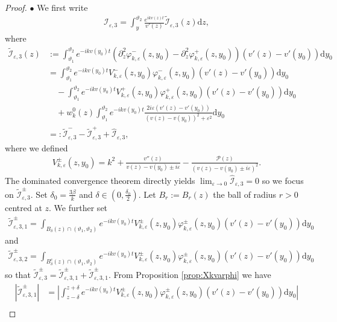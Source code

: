 \documentclass[10pt,a4paper]{amsart}
\newcommand\cI{{\mathcal I}}
\newcommand{\bullpar}[1]{\vspace{.5em}\noindent $\bullet$ \normalfont {\bfseries #1.}}
\newcommand{\ep}{\varepsilon}
\renewcommand{\P}{{\mathcal{P}}}
\renewcommand{\d}{\mathrm{d}}
\begin{document}
\begin{proof}
\bullpar{Estimates for $\cI_{\ep,3}$} 
We first write
\begin{align*}
\cI_{\ep,3} = \int_y^{\vartheta_2} \frac{e^{ikv(z) t}}{v'(z)}  \widetilde\cI_{\ep,3}(z) \d z,
\end{align*}
where
\begin{align*}
\widetilde\cI_{\ep,3}(z) &:= \int_{\vartheta_1}^{\vartheta_2} e^{-ikv(y_0)t}\left( \partial_z^2\varphi_{k,\ep}^-(z,y_0) - \partial_z^2\varphi_{k,\ep}^+(z,y_0) \right) (v'(z) - v'(y_0))\d y_0 \\
&= \int_{\vartheta_1}^{\vartheta_2} e^{-ikv(y_0)t} V_{k,\ep}^-(z,y_0)\varphi_{k,\ep}^-(z,y_0)(v'(z) - v'(y_0)) \d y_0 \\
& \quad - \int_{\vartheta_1}^{\vartheta_2} e^{-ikv(y_0)t} V_{k,\ep}^+(z,y_0) \varphi_{k,\ep}^+(z,y_0)(v'(z) - v'(y_0)) \d y_0 \\
& \quad+ w_k^0(z)\int_{\vartheta_1}^{\vartheta_2}e^{-ikv(y_0)t}\frac{2i\ep(v'(z) - v'(y_0))}{(v(z) - v(y_0))^2 + \ep^2} \d y_0 \\
&=:\widetilde\cI_{\ep,3}^- - \widetilde\cI_{\ep,3}^+ + \widehat{\cI}_{\ep,3},
\end{align*}
where we defined
\begin{align*}
V_{k,\ep}^\pm(z,y_0) = k^2 + \frac{v''(z)}{v(z) - v(y_0) \pm i\ep} - \frac{\P(z)}{(v(z) - v(y_0) \pm i\ep)^2} .
\end{align*}
The dominated convergence theorem directly yields $\lim_{\ep\rightarrow 0} \widehat{\cI}_{\ep,3}=0$ so we focus on $\widetilde\cI_{\ep,3}^\pm$. Set $\delta_0 =\frac{3\beta}{k}$ and $\delta\in (0,\frac{\delta_0}{2})$. Let $B_r:=B_r(z)$ the ball of radius $r>0$ centred at $z$. We further set
\begin{align*}
\widetilde\cI_{\ep,3,1}^\pm = \int_{B_\delta(z)\cap(\vartheta_1,\vartheta_2)}e^{-ikv(y_0)t}V_{k,\ep}^\pm(z,y_0)\varphi_{k,\ep}^\pm(z,y_0) (v'(z) - v'(y_0)) \d y_0
\end{align*}
and
\begin{align*}
\widetilde\cI_{\ep,3,2}^\pm = \int_{B_\delta^c(z)\cap(\vartheta_1,\vartheta_2)}e^{-ikv(y_0)t}V_{k,\ep}^\pm(z,y_0)\varphi_{k,\ep}^\pm(z,y_0) (v'(z) - v'(y_0)) \d y_0
\end{align*}
so that $\widetilde\cI_{\ep,3}^\pm = \widetilde\cI_{\ep,3,1}^\pm + \widetilde\cI_{\ep,3,1}^\pm$. From Proposition \ref{prop:Xkvarphi} we have
\begin{align*}
|\widetilde\cI_{\ep,3,1}^\pm| & = \left|  \int_{z-\delta}^{z+\delta} e^{-ikv(y_0)t} V_{k,\ep}^\pm(z,y_0) \varphi_{k,\ep}^\pm(z,y_0)(v'(z) - v'(y_0)) \d y_0 \right| \\

\end{align*}
\end{proof}
\end{document}
